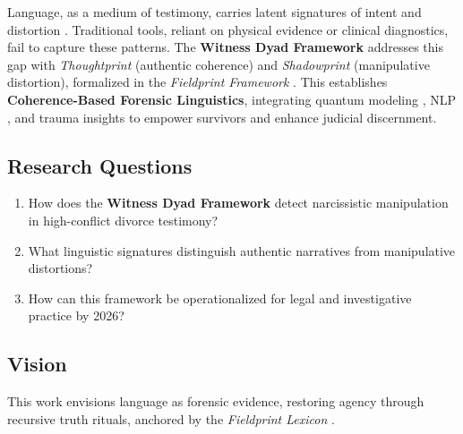 \documentclass[11pt]{article}
\newcommand{\thoughtprint}{\textit{Thoughtprint}}
\newcommand{\shadowprint}{\textit{Shadowprint}}
\newcommand{\witnessdyad}{\textbf{Witness Dyad Framework}}
\begin{document}
Language, as a medium of testimony, carries latent signatures of intent and distortion \citep{pennebaker2003,shuy1993}. Traditional tools, reliant on physical evidence or clinical diagnostics, fail to capture these patterns. The \witnessdyad{} addresses this gap with \thoughtprint{} (authentic coherence) and \shadowprint{} (manipulative distortion), formalized in the \textit{Fieldprint Framework} \citep{havens2025b}. This establishes \textbf{Coherence-Based Forensic Linguistics}, integrating quantum modeling \citep{havens2025a}, NLP \citep{bird2009}, and trauma insights \citep{herman1992,ekman2003} to empower survivors and enhance judicial discernment.

\subsection{Research Questions}
\begin{enumerate}
    \item How does the \witnessdyad{} detect narcissistic manipulation in high-conflict divorce testimony?
    \item What linguistic signatures distinguish authentic narratives from manipulative distortions?
    \item How can this framework be operationalized for legal and investigative practice by 2026?
\end{enumerate}

\subsection{Vision}
This work envisions language as forensic evidence, restoring agency through recursive truth rituals, anchored by the \textit{Fieldprint Lexicon} \citep{havens2025b}.
\end{document}
